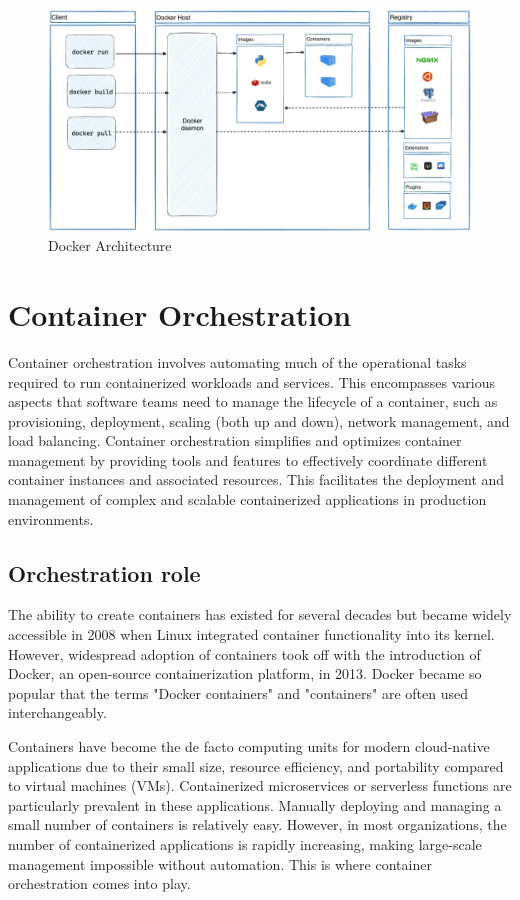 \begin{figure}[h]
  \centering
  \includegraphics[width=\textwidth]{Figures/docker-architecture.png}
  \caption{Docker Architecture}
  \label{fig:container_architecture}
\end{figure}

\section{Container Orchestration}

Container orchestration involves automating much of the operational tasks required to run containerized workloads and services. This encompasses various aspects that software teams need to manage the lifecycle of a container, such as provisioning, deployment, scaling (both up and down), network management, and load balancing. Container orchestration simplifies and optimizes container management by providing tools and features to effectively coordinate different container instances and associated resources. This facilitates the deployment and management of complex and scalable containerized applications in production environments.

\subsection{Orchestration role}

The ability to create containers has existed for several decades but became widely accessible in 2008 when Linux integrated container functionality into its kernel. However, widespread adoption of containers took off with the introduction of Docker, an open-source containerization platform, in 2013. Docker became so popular that the terms "Docker containers" and "containers" are often used interchangeably.

Containers have become the de facto computing units for modern cloud-native applications due to their small size, resource efficiency, and portability compared to virtual machines (VMs). Containerized microservices or serverless functions are particularly prevalent in these applications. Manually deploying and managing a small number of containers is relatively easy. However, in most organizations, the number of containerized applications is rapidly increasing, making large-scale management impossible without automation. This is where container orchestration comes into play.

